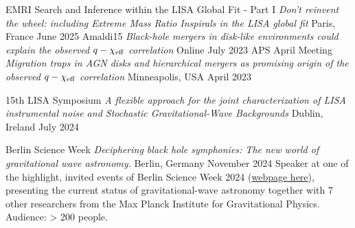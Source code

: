 

\begin{cventries}

\cventry
{EMRI Search and Inference within the LISA Global Fit - Part I}
{\emph{Don’t reinvent the wheel: including Extreme Mass Ratio Inspirals in the LISA global fit}}
{Paris, France}
{June 2025}
{}
\cventry
{Amaldi15}
{\emph{Black-hole mergers in disk-like environments could explain the observed $q-\chi_{\rm eff}$ correlation}}
{Online}
{July 2023}
{}
\cventry
{APS April Meeting}
{\emph{Migration traps in AGN disks and hierarchical mergers as promising origin of the observed $q-\chi_{\rm eff}$ correlation}}
{Minneapolis, USA}
{April 2023}
{}
\end{cventries}


\begin{cventries}

\cventry
{15th LISA Symposium}
{\emph{A flexible approach for the joint characterization of LISA instrumental noise and Stochastic Gravitational-Wave Backgrounds}}
{Dublin, Ireland}
{July 2024}
{}
%
\end{cventries}


\begin{cventries}

\cventry
{Berlin Science Week}
{\emph{Deciphering black hole symphonies: The new world of gravitational wave astronomy.}}
{Berlin, Germany}
{November 2024}
{Speaker at one of the highlight, invited events of Berlin Science Week 2024 (\href{https://berlinscienceweek.com/programme/deciphering-black-hole-symphonies-new-world-gravitational-wave-astronomy}{webpage here}), presenting the current status of gravitational-wave astronomy together with 7 other researchers from the Max Planck Institute for Gravitational Physics. Audience: > 200 people.}
%
\end{cventries}
